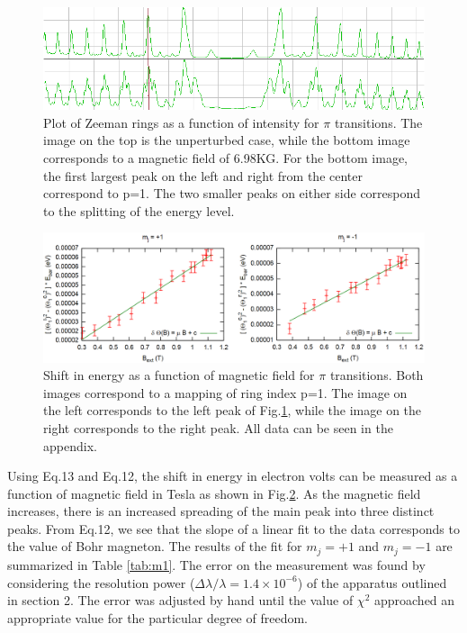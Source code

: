 \documentclass[12pt]{article}
\begin{document}
\begin{figure}[h!]\centering
 \quad \includegraphics[width=01\textwidth]{90split}
\caption{Plot of Zeeman rings as a function of intensity for $\pi$ transitions. The image on the top is the unperturbed case, while the bottom image corresponds to a magnetic field of 6.98KG. For the bottom image, the first largest peak on the left and right from the center correspond to p=1. The two smaller peaks on either side correspond to the splitting of the energy level. }
\label{fig:90split}
\end{figure}
\begin{figure}[h!]\centering
 \quad \includegraphics[width=1\textwidth]{90deg}
\caption{Shift in energy as a function of magnetic field for $\pi$ transitions. Both images correspond to a mapping of ring index p=1. The image on the left corresponds to the left peak of Fig.\ref{fig:90split}, while the image on the right corresponds to the right peak. All data can be seen in the appendix.}
\label{fig:90deg}
\end{figure}
\noindent
Using Eq.13 and Eq.12, the shift in energy in electron volts can be measured as a function of magnetic field in Tesla as shown in Fig.\ref{fig:90deg}. As the magnetic field increases, there is an increased spreading of the main peak into three distinct peaks. From Eq.12, we see that the slope of a linear fit to the data corresponds to the value of Bohr magneton. The results of the fit  for $m_j = +1$  and $m_j = -1$ are summarized in Table \ref{tab:m1}. The error on the measurement was found by considering the resolution power \cite{manual} ($\Delta \lambda / \lambda = 1.4\times 10^{-6}$) of the apparatus outlined in section 2. The error was adjusted by hand until the value of $\chi^2$ approached an appropriate value for the particular degree of freedom.
\end{document}
